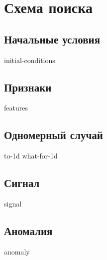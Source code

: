 \section[Схема]{Схема поиска}

\subsection{Начальные условия}

{initial-conditions}

\subsection{Признаки}

{features}

\subsection{Одномерный случай}

{to-1d}
{what-for-1d}


\subsection{Сигнал}

{signal}

\subsection{Аномалия}

{anomaly}
